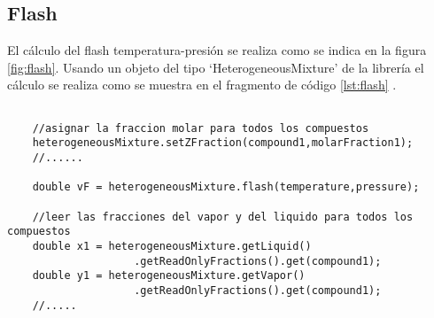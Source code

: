 \subsection{Flash}\label{subsec:flash}


	El cálculo del flash temperatura-presión se realiza como se indica en la figura \ref{fig:flash}. Usando un objeto del tipo `HeterogeneousMixture' de la librería \Materia el cálculo se realiza como se muestra en el fragmento de código \ref{lst:flash} .

\begin{lstlisting}[label={lst:flash},caption={Cálculo del flash temperatura-presión.}]

	//asignar la fraccion molar para todos los compuestos
	heterogeneousMixture.setZFraction(compound1,molarFraction1);
	//...... 

	double vF = heterogeneousMixture.flash(temperature,pressure);

	//leer las fracciones del vapor y del liquido para todos los compuestos
	double x1 = heterogeneousMixture.getLiquid()
					.getReadOnlyFractions().get(compound1);
	double y1 = heterogeneousMixture.getVapor()
					.getReadOnlyFractions().get(compound1);
	//.....
\end{lstlisting}
